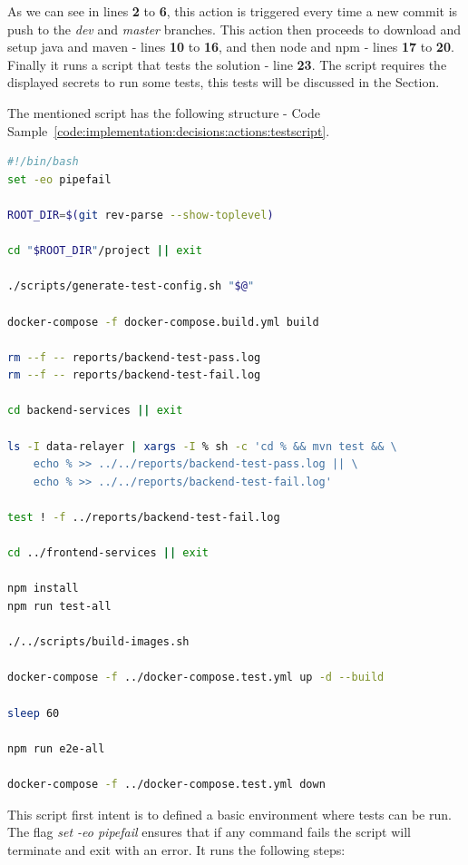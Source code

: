 As we can see in lines \textbf{2} to \textbf{6}, this action is triggered every time a new commit is push to the \textit{dev} and \textit{master} branches.
This action then proceeds to download and setup java and maven - lines \textbf{10} to \textbf{16}, and then node and npm - lines \textbf{17} to \textbf{20}. Finally it runs a script that tests the solution - line \textbf{23}. The script requires the displayed secrets to run some tests, this tests will be discussed in the  Section.

The mentioned script has the following structure - Code Sample~\ref{code:implementation:decisions:actions:testscript}.

\begin{lstlisting}[language=bash, style=bash, caption=Sensae Console Test Suite Script, label={code:implementation:decisions:actions:testscript}]
#!/bin/bash
set -eo pipefail

ROOT_DIR=$(git rev-parse --show-toplevel)

cd "$ROOT_DIR"/project || exit

./scripts/generate-test-config.sh "$@"

docker-compose -f docker-compose.build.yml build

rm --f -- reports/backend-test-pass.log
rm --f -- reports/backend-test-fail.log

cd backend-services || exit

ls -I data-relayer | xargs -I % sh -c 'cd % && mvn test && \
    echo % >> ../../reports/backend-test-pass.log || \
    echo % >> ../../reports/backend-test-fail.log'

test ! -f ../reports/backend-test-fail.log

cd ../frontend-services || exit

npm install
npm run test-all

./../scripts/build-images.sh

docker-compose -f ../docker-compose.test.yml up -d --build

sleep 60

npm run e2e-all

docker-compose -f ../docker-compose.test.yml down
\end{lstlisting}

This script first intent is to defined a basic environment where tests can be run.
The flag \textit{set -eo pipefail} ensures that if any command fails the script will terminate and exit with an error.
It runs the following steps:

